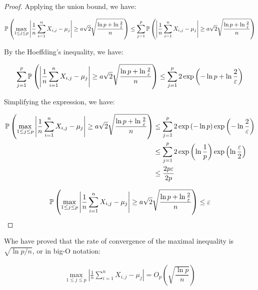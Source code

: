 \begin{proof}

Applying the union bound, we have:

\begin{align*}
\mathbb{P}\left(
    \max_{1 \leq j \leq p}{
        \left|
            \frac{1}{n} \sum_{i=1}^{n} X_{i,j} - \mu_{j}
        \right|
    }
    \geq
    a \sqrt{2} \sqrt{
        \dfrac{\ln p + \ln \frac{2}{\varepsilon}}{n}
    }
\right)
\leq
\sum_{j=1}^{p} \mathbb{P}\left(
    \left|
        \frac{1}{n} \sum_{i=1}^{n} X_{i,j} - \mu_{j}
    \right|
    \geq
    a \sqrt{2} \sqrt{
        \dfrac{\ln p + \ln \frac{2}{\varepsilon}}{n}
    }
\right)
\end{align*}

By the Hoeffding's inequality, we have:

\begin{align*}
\sum_{j=1}^{p} \mathbb{P}\left(
    \left|
        \frac{1}{n} \sum_{i=1}^{n} X_{i,j} - \mu_{j}
    \right|
    \geq
    a \sqrt{2} \sqrt{
        \dfrac{\ln p + \ln \frac{2}{\varepsilon}}{n}
    }
\right)
\leq
\sum_{j=1}^{p} 2 \exp{\left(
    - \ln p + \ln \frac{2}{\varepsilon}
\right)}
\end{align*}

Simplifying the expression, we have:

\begin{align*}
\mathbb{P}\left(
    \max_{1 \leq j \leq p}{
        \left|
            \frac{1}{n} \sum_{i=1}^{n} X_{i,j} - \mu_{j}
        \right|
    }
    \geq
    a \sqrt{2} \sqrt{
        \dfrac{\ln p + \ln \frac{2}{\varepsilon}}{n}
    }
\right)
&\leq
\sum_{j = 1}^{p} 2 \exp\left(- \ln p\right) \exp\left(- \ln \frac{2}{\varepsilon}\right) \\
&\leq
\sum_{j = 1}^{p} 2 \exp\left(\ln \frac{1}{p}\right) \exp\left(\ln \frac{\varepsilon}{2}\right) \\
&\leq
\dfrac{2 p \varepsilon}{ 2 p}
\end{align*}

\begin{align*}
\mathbb{P}\left(
    \max_{1 \leq j \leq p}{
        \left|
            \frac{1}{n} \sum_{i=1}^{n} X_{i,j} - \mu_{j}
        \right|
    }
    \geq
    a \sqrt{2} \sqrt{
        \dfrac{\ln p + \ln \frac{2}{\varepsilon}}{n}
    }
\right)
\leq \varepsilon 
\end{align*}

\end{proof}

Whe have proved that the rate of convergence of the maximal inequality is $\sqrt{\ln p / n}$, or in big-O notation:

\begin{align*}
\max_{1 \leq j \leq p}{
    \left|
        \frac{1}{n} \sum_{i=1}^{n} X_{i,j} - \mu_{j}
    \right|
} = O_p \left(
    \sqrt{\dfrac{\ln p}{n}}
\right)
\end{align*}